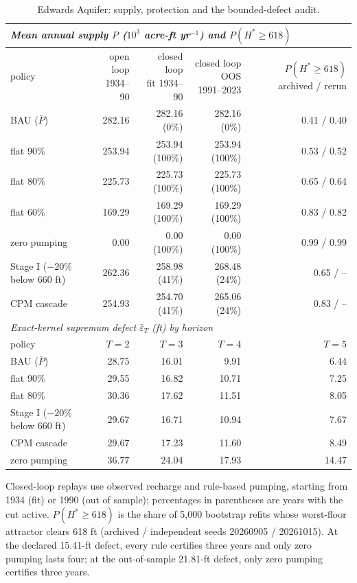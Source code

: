 \documentclass[11pt,a4paper]{article}
\theoremstyle{plain}
\theoremstyle{definition}
\theoremstyle{remark}
\begin{document}
\begin{table}[t]
\centering
\caption{Edwards Aquifer: supply, protection and the bounded-defect audit.}
\label{tab:edw-unc}
\small
\setlength{\tabcolsep}{4pt}
\begin{tabular}{lrrrr}
\toprule
\multicolumn{5}{l}{\emph{Mean annual supply $P$ ($10^3$ acre-ft yr$^{-1}$) and $P(H^*\ge618)$}} \\
\midrule
policy & \shortstack{open loop\\1934--90} & \shortstack{closed loop\\fit 1934--90} & \shortstack{closed loop OOS\\1991--2023} & \shortstack{$P(H^*\ge618)$\\archived / rerun} \\
\midrule
BAU ($\bar P$) & 282.16 & 282.16 (0\%) & 282.16 (0\%) & 0.41 / 0.40 \\
flat 90\% & 253.94 & 253.94 (100\%) & 253.94 (100\%) & 0.53 / 0.52 \\
flat 80\% & 225.73 & 225.73 (100\%) & 225.73 (100\%) & 0.65 / 0.64 \\
flat 60\% & 169.29 & 169.29 (100\%) & 169.29 (100\%) & 0.83 / 0.82 \\
zero pumping & 0.00 & 0.00 (100\%) & 0.00 (100\%) & 0.99 / 0.99 \\
Stage I ($-20\%$ below 660 ft) & 262.36 & 258.98 (41\%) & 268.48 (24\%) & 0.65 / -- \\
CPM cascade & 254.93 & 254.70 (41\%) & 265.06 (24\%) & 0.83 / -- \\
\midrule
\multicolumn{5}{l}{\emph{Exact-kernel supremum defect $\bar\varepsilon_T$ (ft) by horizon}} \\
\midrule
policy & $T=2$ & $T=3$ & $T=4$ & $T=5$ \\
\midrule
BAU ($\bar P$) & 28.75 & 16.01 & 9.91 & 6.44 \\
flat 90\% & 29.55 & 16.82 & 10.71 & 7.25 \\
flat 80\% & 30.36 & 17.62 & 11.51 & 8.05 \\
Stage I ($-20\%$ below 660 ft) & 29.67 & 16.71 & 10.94 & 7.67 \\
CPM cascade & 29.67 & 17.23 & 11.60 & 8.49 \\
zero pumping & 36.77 & 24.04 & 17.93 & 14.47 \\
\bottomrule
\end{tabular}
\par\smallskip\begin{minipage}{0.97\linewidth}\footnotesize Closed-loop replays use observed recharge and rule-based pumping, starting from 1934 (fit) or 1990 (out of sample); percentages in parentheses are years with the cut active. $P(H^*\ge618)$ is the share of 5,000 bootstrap refits whose worst-floor attractor clears 618 ft (archived / independent seeds 20260905 / 20261015). At the declared 15.41-ft defect, every rule certifies three years and only zero pumping lasts four; at the out-of-sample 21.81-ft defect, only zero pumping certifies three years.\end{minipage}
\end{table}
\end{document}
